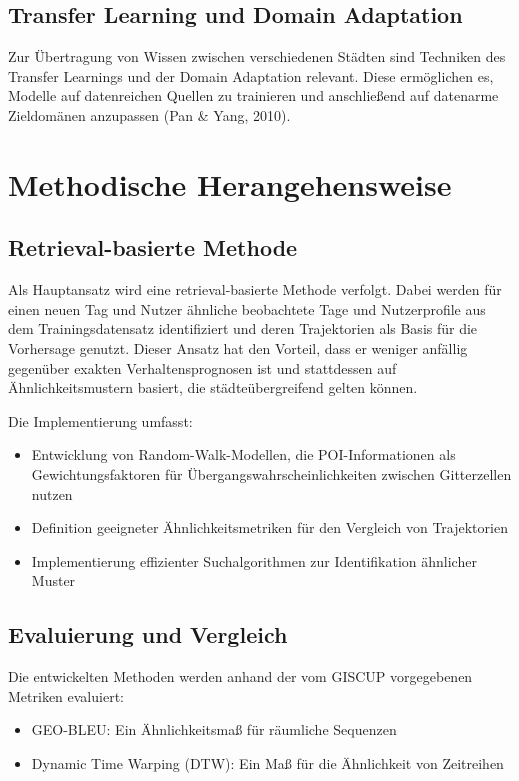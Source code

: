 \documentclass[a4paper,12pt]{article}
\begin{document}
\subsection{Transfer Learning und Domain Adaptation}

Zur Übertragung von Wissen zwischen verschiedenen Städten sind Techniken des Transfer Learnings und der Domain Adaptation relevant. Diese ermöglichen es, Modelle auf datenreichen Quellen zu trainieren und anschließend auf datenarme Zieldomänen anzupassen (Pan \& Yang, 2010).

\section{Methodische Herangehensweise}

\subsection{Retrieval-basierte Methode}

Als Hauptansatz wird eine retrieval-basierte Methode verfolgt. Dabei werden für einen neuen Tag und Nutzer ähnliche beobachtete Tage und Nutzerprofile aus dem Trainingsdatensatz identifiziert und deren Trajektorien als Basis für die Vorhersage genutzt. Dieser Ansatz hat den Vorteil, dass er weniger anfällig gegenüber exakten Verhaltensprognosen ist und stattdessen auf Ähnlichkeitsmustern basiert, die städteübergreifend gelten können.

Die Implementierung umfasst:
\begin{itemize}
    \item Entwicklung von Random-Walk-Modellen, die POI-Informationen als Gewichtungsfaktoren für Übergangswahrscheinlichkeiten zwischen Gitterzellen nutzen
    \item Definition geeigneter Ähnlichkeitsmetriken für den Vergleich von Trajektorien
    \item Implementierung effizienter Suchalgorithmen zur Identifikation ähnlicher Muster
\end{itemize}

\subsection{Evaluierung und Vergleich}

Die entwickelten Methoden werden anhand der vom GISCUP vorgegebenen Metriken evaluiert:
\begin{itemize}
    \item GEO-BLEU: Ein Ähnlichkeitsmaß für räumliche Sequenzen
    \item Dynamic Time Warping (DTW): Ein Maß für die Ähnlichkeit von Zeitreihen
\end{itemize}
\end{document}
